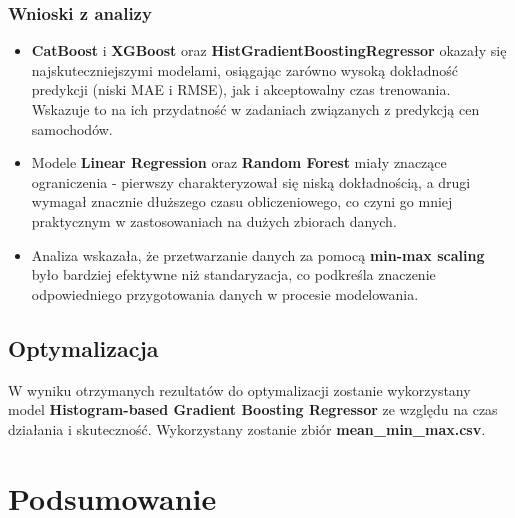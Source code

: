 \documentclass[10pt,letterpaper]{article}
\begin{document}
\subsubsection{Wnioski z analizy}

\begin{itemize}
\item \textbf{CatBoost} i \textbf{XGBoost} oraz \textbf{ HistGradientBoostingRegressor} okazały się najskuteczniejszymi modelami, osiągając zarówno wysoką dokładność predykcji (niski MAE i RMSE), jak i akceptowalny czas trenowania. Wskazuje to na ich przydatność w zadaniach związanych z predykcją cen samochodów.
\item Modele \textbf{Linear Regression} oraz \textbf{Random Forest} miały znaczące ograniczenia - pierwszy charakteryzował się niską dokładnością, a drugi wymagał znacznie dłuższego czasu obliczeniowego, co czyni go mniej praktycznym w zastosowaniach na dużych zbiorach danych.
\item Analiza wskazała, że przetwarzanie danych za pomocą \textbf{min-max scaling} było bardziej efektywne niż standaryzacja, co podkreśla znaczenie odpowiedniego przygotowania danych w procesie modelowania.
\end{itemize}

\newpage
\subsection{Optymalizacja}
W wyniku otrzymanych rezultatów do optymalizacji zostanie wykorzystany model \textbf{Histogram-based Gradient Boosting Regressor} ze względu na czas działania i skuteczność. Wykorzystany zostanie zbiór \textbf{mean\_min\_max.csv}.

\section{Podsumowanie}


 
\end{document}
